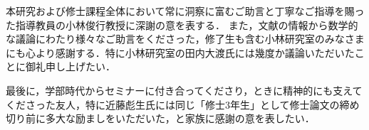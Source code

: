 本研究および修士課程全体において常に洞察に富むご助言と丁寧なご指導を賜った指導教員の小林俊行教授に深謝の意を表する．%
また，文献の情報から数学的な議論にわたり様々なご助言をくださった，修了生も含む小林研究室のみなさまにも心より感謝する．特に小林研究室の田内大渡氏には幾度か議論いただいたことに御礼申し上げたい．

最後に，学部時代からセミナーに付き合ってくださり，ときに精神的にも支えてくださった友人，特に近藤彪生氏には同じ「修士3年生」として修士論文の締め切り前に多大な励ましをいただいた，と家族に感謝の意を表したい．
